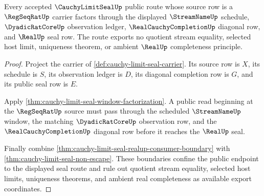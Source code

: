 \begin{theorem}
\label{thm:cauchy-limit-seal-regseqrat-window-nonescape}
Every accepted $\CauchyLimitSealUp$ public route whose source row is a $\RegSeqRatUp$ carrier factors through the displayed $\StreamNameUp$ schedule, $\DyadicRatCoreUp$ observation ledger, $\RealCauchyCompletionUp$ diagonal row, and $\RealUp$ seal row. The route exports no quotient stream equality, selected host limit, uniqueness theorem, or ambient $\RealUp$ completeness principle.
\end{theorem}
\begin{proof}
Project the carrier of \autoref{def:cauchy-limit-seal-carrier}. Its source row is $X$, its schedule is $S$, its observation ledger is $D$, its diagonal completion row is $G$, and its public seal row is $E$.

Apply \autoref{thm:cauchy-limit-seal-window-factorization}. A public read beginning at the $\RegSeqRatUp$ source must pass through the scheduled $\StreamNameUp$ window, the matching $\DyadicRatCoreUp$ observation row, and the $\RealCauchyCompletionUp$ diagonal row before it reaches the $\RealUp$ seal.

Finally combine \autoref{thm:cauchy-limit-seal-realup-consumer-boundary} with \autoref{thm:cauchy-limit-seal-non-escape}. These boundaries confine the public endpoint to the displayed seal route and rule out quotient stream equality, selected host limits, uniqueness theorems, and ambient real completeness as available export coordinates.
\end{proof}

